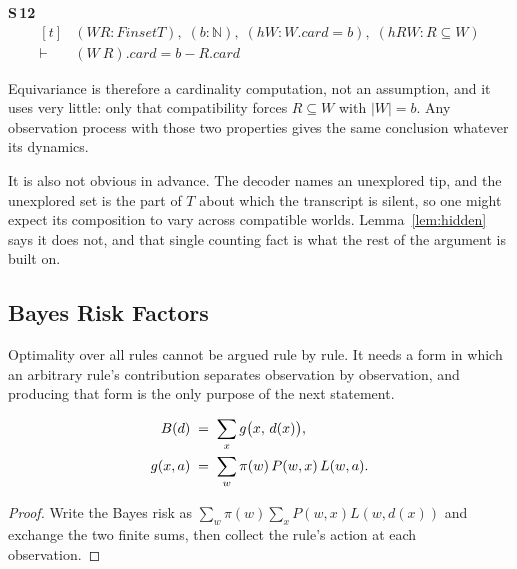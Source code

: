 \noindent\textbf{S\,12}\quad{}
{\footnotesize\[ \begin{aligned}[t]
&(\mathit{W} \mathit{R} : \mathit{Finset} \mathit{T}),\; (\mathit{b} : \mathbb{N} ),\; (\mathit{hW} : \mathit{W}.\mathit{card} = \mathit{b}),\; (\mathit{hRW} : \mathit{R} \subseteq \mathit{W})\\
\vdash\;&(\mathit{W} \ \mathit{R}).\mathit{card} = \mathit{b} - \mathit{R}.\mathit{card}
\end{aligned} \]}


Equivariance is therefore a cardinality computation, not an assumption, and it uses very
little: only that compatibility forces $R\subseteq W$ with $|W|=b$. Any observation process
with those two properties gives the same conclusion whatever its dynamics.

It is also not obvious in advance. The decoder names an unexplored tip, and the unexplored set
is the part of $T$ about which the transcript is silent, so one might expect its composition
to vary across compatible worlds. Lemma~\ref{lem:hidden} says it does not, and that single
counting fact is what the rest of the argument is built on.

\subsection{Bayes Risk Factors}
\label{sec:bayes}

Optimality over all rules cannot be argued rule by rule. It needs a form in which an arbitrary
rule's contribution separates observation by observation, and producing that form is the only
purpose of the next statement.

\begin{theorem}[Factorisation]
\label{thm:factor}
\begin{align}
B(d)&\;=\;\sum_{x} g\bigl(x,\,d(x)\bigr),\notag\\
g(x,a)&\;=\;\sum_{w}\pi(w)\,P(w,x)\,L(w,a).
\label{eq:bayes}
\end{align}
\end{theorem}

\begin{proof}
Write the Bayes risk as $\sum_{w}\pi(w)\sum_{x}P(w,x)L(w,d(x))$ and exchange the two finite
sums, then collect the rule's action at each observation.
\end{proof}

